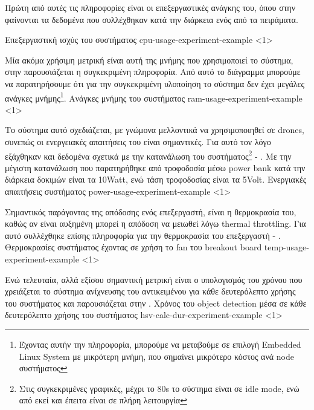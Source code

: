 Πρώτη από αυτές τις πληροφορίες είναι οι επεξεργαστικές ανάγκης του, όπου στην 
φαίνονται τα δεδομένα που συλλέχθηκαν κατά την διάρκεια ενός από τα πειράματα. 

{Επεξεργαστική ισχύς του συστήματος}%
{cpu-usage-experiment-example}%
<1>

Μία ακόμα χρήσιμη μετρική είναι αυτή της μνήμης που χρησιμοποιεί το σύστημα, στην 
παρουσιάζεται η συγκεκριμένη πληροφορία. Από αυτό το διάγραμμα μπορούμε να παρατηρήσουμε ότι για την συγκεκριμένη υλοποίηση το σύστημα δεν έχει μεγάλες ανάγκες μνήμης\footnote{Έχοντας αυτήν την πληροφορία, μπορούμε να μεταβούμε σε επιλογή Embedded Linux System με μικρότερη μνήμη, που σημαίνει μικρότερο κόστος ανά node συστήματος}.
{Ανάγκες μνήμης του συστήματος}%
{ram-usage-experiment-example}%
<1>

Το σύστημα αυτό σχεδιάζεται, με γνώμονα μελλοντικά να χρησιμοποιηθεί σε drones, συνεπώς οι ενεργειακές απαιτήσεις του είναι σημαντικές. Για αυτό τον λόγο ε\-ξά\-χθη\-καν και δεδομένα σχετικά με την κατανάλωση του συστήματος\footnote{Στις συγκεκριμένες γραφικές, μέχρι το 80s το σύστημα είναι σε idle mode, ενώ από εκεί και έπειτα είναι σε πλήρη λειτουργία} - . Με την μέγιστη κατανάλωση που παρατηρήθηκε από τροφοδοσία μέσω power bank κατά την διάρκεια δοκιμών είναι τα 10Watt, ενώ τάση τροφοδοσίας είναι τα 5Volt.
{Ενεργιακές απαιτήσεις συστήματος}%
{power-usage-experiment-example}%
<1>

Σημαντικός παράγοντας της απόδοσης ενός επεξεργαστή, είναι η θερμοκρασία του, καθώς αν είναι αυξημένη μπορεί η απόδοση να μειωθεί λόγω thermal throttling. Για αυτό συλλέχθηκε επίσης πληροφορία για την θερμοκρασία του επεξεργαστή - . 
{Θερμοκρασίες συστήματος έχοντας σε χρήση το fan του breakout board}%
{temp-usage-experiment-example}%
<1>

Ενώ τελευταία, αλλά εξίσου σημαντική μετρική είναι ο υπολογισμός του χρόνου που χρειάζεται το σύστημα ανίχνευσης του αντικειμένου για κάθε δευτερόλεπτο χρήσης του συστήματος και παρουσιάζεται στην .
{Χρόνος του object detection μέσα σε κάθε δευτερόλεπτο χρήσης του συστήματος}%
{hsv-calc-dur-experiment-example}%
<1>

